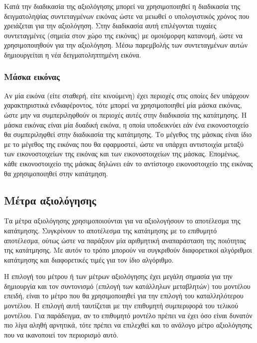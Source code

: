 \documentclass[a4paper,12pt]{article}
\begin{document}
Κατά την διαδικασία της αξιολόγησης μπορεί να χρησιμοποιηθεί η διαδικασία της
δειγματοληψίας συντεταγμένων εικόνας ώστε να μειωθεί ο υπολογιστικός χρόνος που
χρειάζεται για την αξιολόγηση. Στην διαδικασία αυτή επιλέγονται τυχαίες
συντεταγμένες (σημεία στον χώρο της εικόνας) με ομοιόμορφη κατανομή, ώστε να
χρησιμοποιηθούν για την αξιολόγηση. Μέσω παρεμβολής των συντεταγμένων αυτών
δημιουργείται η νέα δειγματοληπτημένη εικόνα.

\subsubsection{Μάσκα εικόνας} \label{reg:mask:1}

Αν μία εικόνα (είτε σταθερή, είτε κινούμενη) έχει περιοχές στις οποίες δεν
υπάρχουν χαρακτηριστικά ενδιαφέροντος, τότε μπορεί να χρησιμοποιηθεί μία μάσκα
εικόνας, ώστε μην να συμπεριληφθούν οι περιοχές αυτές στην διαδικασία της
κατάτμησης. Η μάσκα εικόνας είναι μία δυαδική εικόνα, η οποία υποδεικνύει εάν
ένα εικονοστοιχείο θα συμπεριληφθεί στην διαδικασία της κατάτμησης. Το μέγεθος
της μάσκας είναι ίδιο με το μέγεθος της εικόνας που θα εφαρμοστεί, ώστε να
υπάρχει αντιστοιχία μεταξύ των εικονοστοιχείων της εικόνας και των
εικονοστοιχείων της μάσκας. Επομένως, κάθε εικονοστοιχείο της μάσκας δηλώνει εάν
το αντίστοιχο εικονοστοιχείο της εικόνας θα χρησιμοποιηθεί στην κατάτμηση.

\subsection{Μέτρα αξιολόγησης}

Τα μέτρα αξιολόγησης χρησιμοποιούνται για να αξιολογήσουν το αποτέλεσμα της
κατάτμησης. Συγκρίνουν το αποτέλεσμα της κατάτμησης με το επιθυμητό αποτέλεσμα,
ούτως ώστε να παράξουν μία αριθμητική αναπαράσταση της ποιότητας της κατάτμησης.
Με αυτόν το τρόπο μπορούν να συγκριθούν διαφορετικοί αλγόριθμοι κατάτμησης και
διαφορετικές τιμές για τον ίδιο αλγόριθμο.

Η επιλογή του μέτρου ή των μέτρων αξιολόγησης έχει μεγάλη σημασία για την
δημιουργία και τον συντονισμό (επιλογή των κατάλληλων μεταβλητών) του μοντέλου
επειδή, είναι το μέτρο που θα χρησιμοποιηθεί για την επιλογή του καταλληλότερου
μοντέλου. Η επιλογή αυτή ταυτίζεται με την επιθυμητή συμπεριφορά του τελικού
μοντέλου. Για παράδειγμα, αν το επιθυμητό μοντέλο πρέπει να έχει όσο είναι
δυνατόν πιο λίγα αληθή αρνητικά, τότε πρέπει να επιλεχθεί και το ανάλογο μέτρο
αξιολόγησης που να ικανοποιεί τον περιορισμό αυτό.
\end{document}
